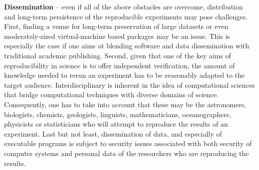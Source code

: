 {\bf Dissemination} -- even if all of the above obstacles are overcome, 
  distribution and long-term persistence of the reproducible experiments
  may pose challenges.
First, finding a venue for long-term preservation of large datasets or even 
  moderately-sized virtual-machine based packages may be an issue.
This is especially the case if one aims at blending software and data
  dissemination with traditional academic publishing.
Second, given that one of the key aims of reproducibility in science
  is to offer independent verification, the amount of knowledge 
  needed to rerun an experiment has to be reasonably adapted to the
  target audience.
Interdisciplinary is inherent in the idea of computational sciences that
  bridge computational techniques with diverse domains of science.
Consequently, one has to take into account that these may be the
  astronomers, biologists, chemists, geologists, linguists, mathematicians,
  oceanographers, physicists or statisticians who will attempt to
  reproduce the results of an experiment.
Last but not least, dissemination of data, and especially of executable
  programs is subject to security issues associated with both security
  of computer systems and personal data of the researchers who
  are reproducing the results.
